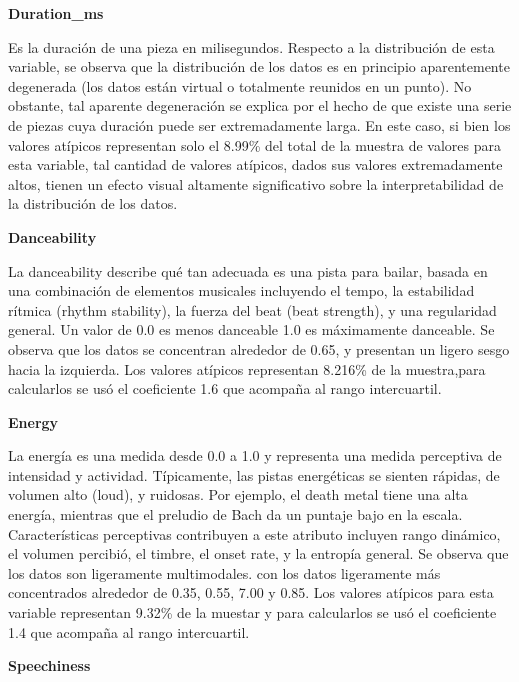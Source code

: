 \documentclass[
  letterpaper,
  DIV=11,
  numbers=noendperiod]{scrartcl}
\begin{document}
\textbf{Duration\_ms}

Es la duración de una pieza en milisegundos. Respecto a la distribución
de esta variable, se observa que la distribución de los datos es en
principio aparentemente degenerada (los datos están virtual o totalmente
reunidos en un punto). No obstante, tal aparente degeneración se explica
por el hecho de que existe una serie de piezas cuya duración puede ser
extremadamente larga. En este caso, si bien los valores atípicos
representan solo el 8.99\% del total de la muestra de valores para esta
variable, tal cantidad de valores atípicos, dados sus valores
extremadamente altos, tienen un efecto visual altamente significativo
sobre la interpretabilidad de la distribución de los datos.

\textbf{Danceability}

La danceability describe qué tan adecuada es una pista para bailar,
basada en una combinación de elementos musicales incluyendo el tempo, la
estabilidad rítmica (rhythm stability), la fuerza del beat (beat
strength), y una regularidad general. Un valor de 0.0 es menos danceable
1.0 es máximamente danceable. Se observa que los datos se concentran
alrededor de 0.65, y presentan un ligero sesgo hacia la izquierda. Los
valores atípicos representan 8.216\% de la muestra,para calcularlos se
usó el coeficiente 1.6 que acompaña al rango intercuartil.

\textbf{Energy}

La energía es una medida desde 0.0 a 1.0 y representa una medida
perceptiva de intensidad y actividad. Típicamente, las pistas
energéticas se sienten rápidas, de volumen alto (loud), y ruidosas. Por
ejemplo, el death metal tiene una alta energía, mientras que el preludio
de Bach da un puntaje bajo en la escala. Características perceptivas
contribuyen a este atributo incluyen rango dinámico, el volumen
percibió, el timbre, el onset rate, y la entropía general. Se observa
que los datos son ligeramente multimodales. con los datos ligeramente
más concentrados alrededor de 0.35, 0.55, 7.00 y 0.85. Los valores
atípicos para esta variable representan 9.32\% de la muestar y para
calcularlos se usó el coeficiente 1.4 que acompaña al rango
intercuartil.

\textbf{Speechiness}
\end{document}
